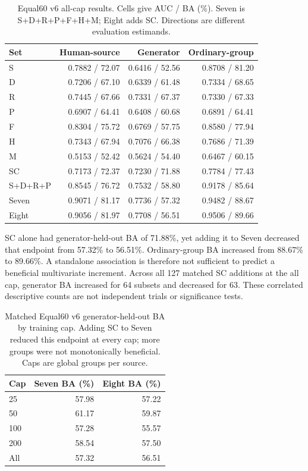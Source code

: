 \begin{table}[htbp]
\centering\small
\caption{Equal60 v6 all-cap results. Cells give AUC / BA (\%). Seven is
S+D+R+P+F+H+M; Eight adds SC. Directions are different evaluation estimands.}
\label{tab:equal60-main}
\begin{tabular}{lrrr}
\toprule
Set & Human-source & Generator & Ordinary-group\\
\midrule
S & 0.7882 / 72.07 & 0.6416 / 52.56 & 0.8708 / 81.20\\
D & 0.7206 / 67.10 & 0.6339 / 61.48 & 0.7334 / 68.65\\
R & 0.7445 / 67.66 & 0.7331 / 67.37 & 0.7330 / 67.33\\
P & 0.6907 / 64.41 & 0.6408 / 60.68 & 0.6891 / 64.41\\
F & 0.8304 / 75.72 & 0.6769 / 57.75 & 0.8580 / 77.94\\
H & 0.7343 / 67.94 & 0.7076 / 66.38 & 0.7686 / 71.39\\
M & 0.5153 / 52.42 & 0.5624 / 54.40 & 0.6467 / 60.15\\
SC & 0.7173 / 72.37 & 0.7230 / 71.88 & 0.7784 / 77.43\\
S+D+R+P & 0.8545 / 76.72 & 0.7532 / 58.80 & 0.9178 / 85.64\\
Seven & 0.9071 / 81.17 & 0.7736 / 57.32 & 0.9482 / 88.67\\
Eight & 0.9056 / 81.97 & 0.7708 / 56.51 & 0.9506 / 89.66\\
\bottomrule
\end{tabular}
\end{table}

SC alone had generator-held-out BA of 71.88\%, yet adding it to Seven
decreased that endpoint from 57.32\% to 56.51\%. Ordinary-group BA increased
from 88.67\% to 89.66\%. A standalone association is therefore not sufficient
to predict a beneficial multivariate increment. Across all 127 matched SC
additions at the all cap, generator BA increased for 64 subsets and decreased
for 63. These correlated descriptive counts are not independent trials or
significance tests.

\begin{table}[htbp]
\centering\small
\caption{Matched Equal60 v6 generator-held-out BA by training cap. Adding SC
to Seven reduced this endpoint at every cap; more groups were not monotonically
beneficial. Caps are global groups per source.}
\label{tab:equal60-caps}
\begin{tabular}{lrr}
\toprule
Cap & Seven BA (\%) & Eight BA (\%)\\
\midrule
25 & 57.98 & 57.22\\
50 & 61.17 & 59.87\\
100 & 57.28 & 55.57\\
200 & 58.54 & 57.50\\
All & 57.32 & 56.51\\
\bottomrule
\end{tabular}
\end{table}

